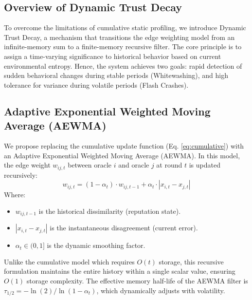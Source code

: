 \documentclass{ieeeaccess}
\begin{document}
\subsection{Overview of Dynamic Trust Decay}
To overcome the limitations of cumulative static profiling, we introduce Dynamic Trust Decay, a mechanism that transitions the edge weighting model from an infinite-memory sum to a finite-memory recursive filter. The core principle is to assign a time-varying significance to historical behavior based on current environmental entropy. Hence, the system achieves two goals: rapid detection of sudden behavioral changes during stable periods (Whitewashing), and high tolerance for variance during volatile periods (Flash Crashes).

\subsection{Adaptive Exponential Weighted Moving Average (AEWMA)}
We propose replacing the cumulative update function (Eq. \ref{eq:cumulative}) with an Adaptive Exponential Weighted Moving Average (AEWMA). In this model, the edge weight $w_{ij,t}$ between oracle $i$ and oracle $j$ at round $t$ is updated recursively:
\begin{equation}
w_{ij,t} = (1 - \alpha_t) \cdot w_{ij,t-1} + \alpha_t \cdot |x_{i,t} - x_{j,t}|
\label{eq:aewma}
\end{equation}
Where:
\begin{itemize}
    \item $w_{ij,t-1}$ is the historical dissimilarity (reputation state).
    \item $|x_{i,t} - x_{j,t}|$ is the instantaneous disagreement (current error).
    \item $\alpha_t \in (0, 1]$ is the dynamic smoothing factor.
\end{itemize}
Unlike the cumulative model which requires $O(t)$ storage, this recursive formulation maintains the entire history within a single scalar value, ensuring $O(1)$ storage complexity. The effective memory half-life of the AEWMA filter is $\tau_{1/2} = -\ln(2) / \ln(1 - \alpha_t)$, which dynamically adjusts with volatility.
\end{document}
